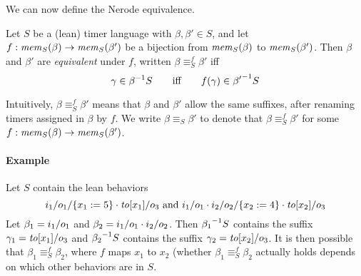 We can now define the Nerode equivalence.

\begin{definition}
  \label{def:bj-nerode}
Let $S$ be a (lean) timer language with $\beta,\beta'\in S$,
and let $f : \getmemorable{S}{\beta} \to \getmemorable{S}{\beta'}$
be a bijection
from $\getmemorable{S}{\beta}$ to $\getmemorable{S}{\beta'}$.
Then $\beta$ and $\beta'$ are \emph{equivalent} under $f$, written
$\beta \equiv_{S}^f \beta'$ iff
\[
\gamma \in \suffixbehs{S}{\beta}
\qquad \mbox{iff} \qquad
f(\gamma) \in \suffixbehs{S}{\beta'}
\]
\end{definition}
Intuitively, $\beta \equiv_{S}^f \beta'$ means that $\beta$ and $\beta'$
allow the same suffixes, after renaming
timers assigned in $\beta$ by $f$.
We write $\beta \equiv_{S} \beta'$ to denote that
$\beta \equiv_{S}^f \beta'$ for some
$f : \getmemorable{S}{\beta} \to \getmemorable{S}{\beta'}$.

\paragraph{Example} Let $S$ contain the lean behaviors
\[
\utlabel{i_1}{o_1}{\set{x_1:=5}} \cdot \simpleutlabel{\toevent{x_1}}{o_3}
\mbox{ and }
\simpleutlabel{i_1}{o_1} \cdot \utlabel{i_2}{o_2}{\set{x_2:=4}} \cdot \simpleutlabel{\toevent{x_2}}{o_3}
\]
Let $\beta_1 = \simpleutlabel{i_1}{o_1}$ and
$\beta_2 = \simpleutlabel{i_1}{o_1} \cdot \simpleutlabel{i_2}{o_2}$.
Then $\suffixbehs{S}{\beta_1}$ contains the suffix
$\gamma_1 = \simpleutlabel{\toevent{x_1}}{o_3}$ and
$\suffixbehs{S}{\beta_2}$ contains the suffix
$\gamma_2 = \simpleutlabel{\toevent{x_2}}{o_3}$.
It is then possible that
$\beta_1 \equiv_S^f \beta_2$, where $f$ maps $x_1$ to $x_2$ (whether
$\beta_1 \equiv_S^f \beta_2$ actually holds depends on which other
behaviors are in $S$.



